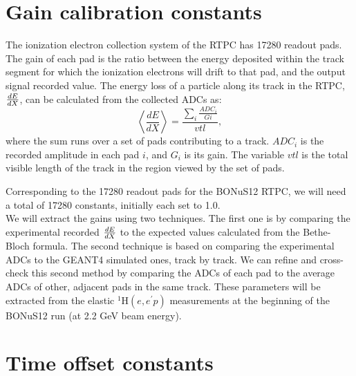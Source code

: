\documentclass[12pt]{article}
\begin{document}
   \section {Gain calibration constants}
 The ionization electron collection system of the RTPC has 17280 readout pads. The gain of 
      each pad is the ratio between the 
      energy deposited within the track segment
      for which the ionization electrons will drift to that pad, 
      and the output signal
      recorded value.      %
   The energy loss of a particle along its track in the RTPC,
$\small{\frac{dE}{dX}}$, can be calculated from the collected ADCs as: 
      \begin{equation}
 \left\langle \frac{dE}{dX} \right\rangle= \frac{\sum\limits_{i} \frac{ADC_{i}}{Gi}}{vtl},
\end{equation}
where the sum runs over a set of pads contributing to a track. $ADC_{i}$ is the 
recorded amplitude in each pad $i$, and $G_{i}$ is its gain. The variable $vtl$ is the 
      total visible length of the track in the region viewed by the set of pads. 

Corresponding to the 17280 readout pads for the BONuS12 RTPC, we will need a
   total of 17280 constants, initially each set to 1.0.
    ~\\

We will extract the gains using two techniques. The first 
      one is by comparing the experimental recorded $\small{\frac{dE}{dX}}$ to 
      the expected values calculated from the Bethe-Bloch formula. The second 
      technique is based on comparing the experimental ADCs to the GEANT4 
      simulated ones, track by track. We
       can refine and cross-check 
       this second method by 
      comparing the ADCs of each pad to the average ADCs of 
	other, adjacent pads in 
      the same track. These parameters will be extracted from the elastic 
      $^1$H$(e,e^\prime p)$ measurements at the beginning of the BONuS12 run (at 2.2 GeV beam energy). 

   
   \section {Time offset constants}
  
\end{document}
